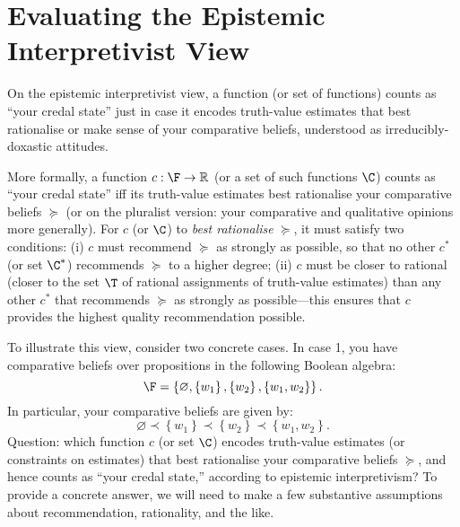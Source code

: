 \section{Evaluating the Epistemic Interpretivist View}\label{konek-sec-7}

On the epistemic interpretivist view, a function (or set of functions) counts as ``your credal state'' just in case it encodes truth-value estimates that best rationalise or make sense of your comparative beliefs, understood as irreducibly-doxastic attitudes.

More formally, a function $c:\F\rightarrow\mathbb{R}$ (or a set of such functions $\C$) counts as ``your credal state'' iff its truth-value estimates best rationalise your comparative beliefs $\succeq$ (or on the pluralist version: your comparative and qualitative opinions more generally). For $c$ (or $\C$) to \textit{best rationalise} $\succeq$, it must satisfy two conditions: (i) $c$ must recommend $\succeq$ as strongly as possible, so that no other $c^*$ (or set $\C^*$) recommends $\succeq$ to a higher degree; (ii) $c$ must be closer to rational (closer to the set $\T$ of rational assignments of truth-value estimates) than any other $c^*$ that recommends $\succeq$ as strongly as possible---this ensures that $c$ provides the highest quality recommendation possible.

To illustrate this view, consider two concrete cases. In case 1, you have comparative beliefs over propositions in the following Boolean algebra:
$$ \F=\left\{\varnothing,\left\{w_1\right\},\left\{w_2\right\},\left\{w_1,w_2\right\}\right\}. $$
In particular, your comparative beliefs are given by:
$$ \varnothing\prec\left\{w_1\right\}\prec\left\{w_2\right\}\prec\left\{w_1,w_2\right\}. $$
Question: which function $c$ (or set $\C$) encodes truth-value estimates (or constraints on estimates) that best rationalise your comparative beliefs $\succeq$, and hence counts as ``your credal state,'' according to epistemic interpretivism? To provide a concrete answer, we will need to make a few substantive assumptions about recommendation, rationality, and the like.

